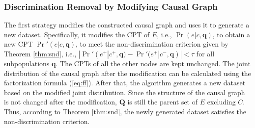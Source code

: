 \documentclass[twoside,leqno,twocolumn]{article}
\begin{document}
\subsubsection{Discrimination Removal by Modifying Causal Graph}
The first strategy modifies the constructed causal graph and uses it to generate a new dataset. Specifically, it modifies the CPT of $E$, i.e., $\Pr(e|c,\mathbf{q})$, to obtain a new CPT ${\Pr}'(e|c,\mathbf{q})$, to meet the non-discrimination criterion given by Theorem \ref{thm:snd}, i.e., $|{\Pr}'(e^{+}|c^{+},\mathbf{q})-{\Pr}'(e^{+}|c^{-},\mathbf{q})| < \tau$ for all subpopulations $\mathbf{q}$. The CPTs of all the other nodes are kept unchanged. The joint distribution of the causal graph after the modification can be calculated using the factorization formula (\ref{eq:ff}). After that, the algorithm generates a new dataset based on the modified joint distribution. Since the structure of the causal graph is not changed after the modification, $\mathbf{Q}$ is still the parent set of $E$ excluding $C$. Thus, according to Theorem \ref{thm:snd}, the newly generated dataset satisfies the non-discrimination criterion.
\end{document}
